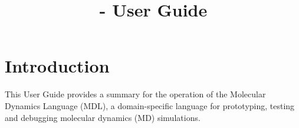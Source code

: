 \documentclass[11pt]{report}
\title{\MDL - User Guide}
\newcommand{\ProtoMol}{\textsc{ProtoMol }}
\begin{document}
\maketitle
\tableofcontents







\chapter{Introduction}

This User Guide provides a summary for the operation of the
Molecular Dynamics Language (MDL), a domain-specific language
for prototyping, testing and debugging molecular dynamics (MD)
simulations.
\end{document}
